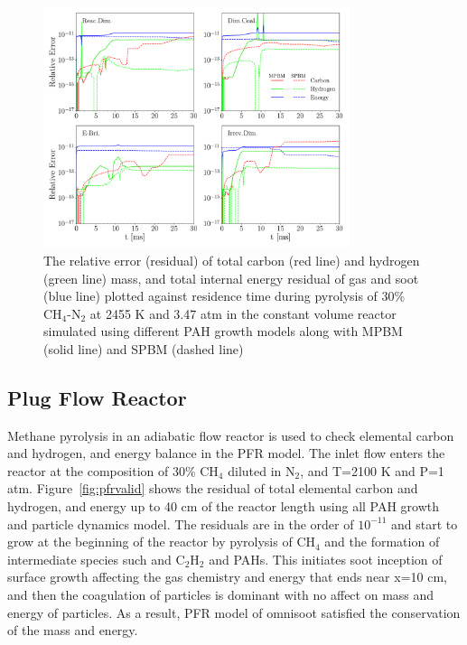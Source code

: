 \begin{figure}[H]
	\centering
	\includegraphics[width=0.8\textwidth]{Figures/Results/Validation/ConstUV/relerr_constuv.pdf}
	\caption{The relative error (residual) of total carbon (red line) and hydrogen (green line) mass, and total internal energy residual of gas and soot (blue line) plotted against residence time during pyrolysis of 30\% $\mathrm{CH_4}$-$\mathrm{N_2}$ at 2455 K and 3.47 atm in the constant volume reactor simulated using different PAH growth models along with MPBM (solid line) and SPBM (dashed line)}
	\label{fig:constuvvalid}
\end{figure}

\subsection{Plug Flow Reactor}
Methane pyrolysis in an adiabatic flow reactor is used to check elemental carbon and hydrogen, and energy balance in the PFR model. The inlet flow enters the reactor at the composition of 30\% $\mathrm{CH_4}$ diluted in $\mathrm{N_2}$, and T=2100 K and P=1 atm. Figure~\ref{fig:pfrvalid} shows the residual of total elemental carbon and hydrogen, and energy up to 40 cm of the reactor length using all PAH growth and particle dynamics model. The residuals are in the order of $10^{-11}$ and start to grow at the beginning of the reactor by pyrolysis of $\mathrm{CH_4}$ and the formation of intermediate species such and $\mathrm{C_2H_2}$ and PAHs. This initiates soot inception of surface growth affecting the gas chemistry and energy that ends near x=10 cm, and then the coagulation of particles is dominant with no affect on mass and energy of particles. As a result, PFR model of omnisoot satisfied the conservation of the mass and energy.


